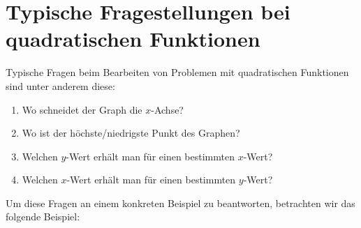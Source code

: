 \documentclass[11pt,oneside]{article}
\begin{document}
\section{Typische Fragestellungen bei quadratischen Funktionen}
	Typische Fragen beim Bearbeiten von Problemen mit quadratischen Funktionen sind unter anderem diese:
	\begin{enumerate}
		\item Wo schneidet der Graph die $x$-Achse?
		\item Wo ist der höchste/niedrigste Punkt des Graphen?
		\item Welchen $y$-Wert erhält man für einen bestimmten $x$-Wert?
		\item Welchen $x$-Wert erhält man für einen bestimmten $y$-Wert?
	\end{enumerate}
	Um diese Fragen an einem konkreten Beispiel zu beantworten, betrachten wir das folgende Beispiel:
\end{document}
